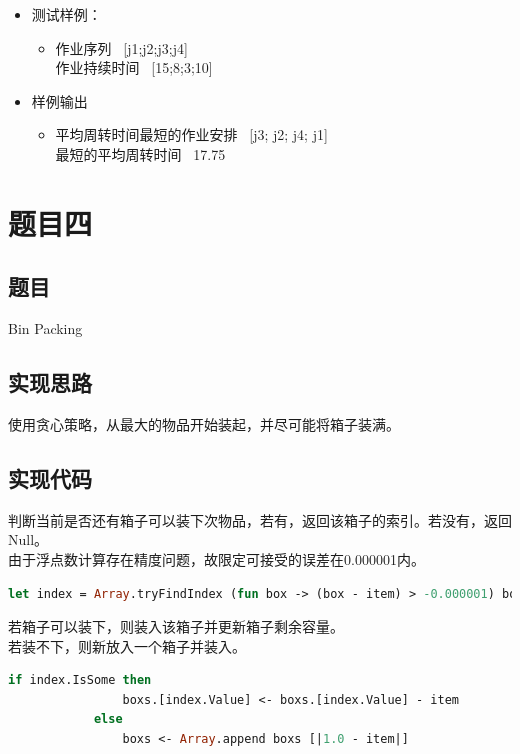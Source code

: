 \documentclass[a4paper]{article}
\begin{document}
\begin{itemize}
\item
    测试样例：
    \begin{itemize}
    \item
        作业序列 \ [j1;j2;j3;j4] \\
        作业持续时间 \ [15;8;3;10]
    \end{itemize}
\item
    样例输出
    \begin{itemize}
    \item
        平均周转时间最短的作业安排 \ [j3; j2; j4; j1] \\
        最短的平均周转时间 \ 17.75
    \end{itemize}
\end{itemize}

\section{题目四}

\subsection{题目}

Bin Packing

\subsection{实现思路}

使用贪心策略，从最大的物品开始装起，并尽可能将箱子装满。

\subsection{实现代码}

判断当前是否还有箱子可以装下次物品，若有，返回该箱子的索引。若没有，返回Null。\\
由于浮点数计算存在精度问题，故限定可接受的误差在0.000001内。

\begin{lstlisting}[language=ML]
            let index = Array.tryFindIndex (fun box -> (box - item) > -0.000001) boxs
\end{lstlisting}

若箱子可以装下，则装入该箱子并更新箱子剩余容量。\\
若装不下，则新放入一个箱子并装入。

\begin{lstlisting}[language=ML]
            if index.IsSome then
                boxs.[index.Value] <- boxs.[index.Value] - item
            else
                boxs <- Array.append boxs [|1.0 - item|]
\end{lstlisting}
\end{document}
